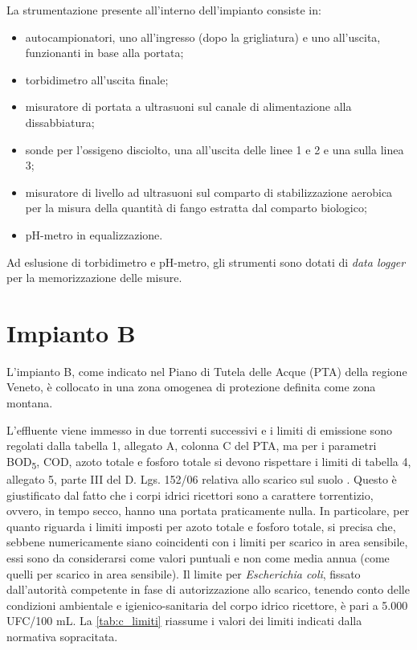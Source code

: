 La strumentazione presente all'interno dell'impianto consiste in:
\begin{itemize}
	\item autocampionatori, uno all'ingresso (dopo la grigliatura) e uno all'uscita, funzionanti in base alla portata;
	\item torbidimetro all'uscita finale;
	\item misuratore di portata a ultrasuoni sul canale di alimentazione alla dissabbiatura;
	\item sonde per l'ossigeno disciolto, una all'uscita delle linee 1 e 2 e una sulla linea 3;
	\item misuratore di livello ad ultrasuoni sul comparto di stabilizzazione aerobica per la misura della quantità di fango estratta dal comparto biologico;
	\item pH-metro in equalizzazione.
\end{itemize}
Ad eslusione di torbidimetro e pH-metro, gli strumenti sono dotati di \textit{data logger} per la memorizzazione delle misure.

\clearpage
\section{Impianto B}
L'impianto B, come indicato nel Piano di Tutela delle Acque (PTA) della regione Veneto, è collocato in una zona omogenea di protezione definita come zona montana.

L'effluente viene immesso in due torrenti successivi e i limiti di emissione sono regolati dalla tabella 1, allegato A, colonna C del PTA, ma per i parametri BOD\textsubscript{5}, COD, azoto totale e fosforo totale si devono rispettare i limiti di tabella 4, allegato 5, parte III del D. Lgs. 152/06 relativa allo scarico sul suolo \cite{PTA} \cite{DLgs152}. Questo è giustificato dal fatto che i corpi idrici ricettori sono a carattere torrentizio, ovvero, in tempo secco, hanno una portata praticamente nulla. In particolare, per quanto riguarda i limiti imposti per azoto totale e fosforo totale, si precisa che, sebbene numericamente siano coincidenti con i limiti per scarico in area sensibile, essi sono da considerarsi come valori puntuali e non come media annua (come quelli per scarico in area sensibile). Il limite per \textit{Escherichia coli}, fissato dall'autorità competente in fase di autorizzazione allo scarico, tenendo conto delle condizioni ambientale e igienico-sanitaria del corpo idrico ricettore, è pari a 5.000 UFC/100 mL. La \autoref{tab:c_limiti} riassume i valori dei limiti indicati dalla normativa sopracitata.

